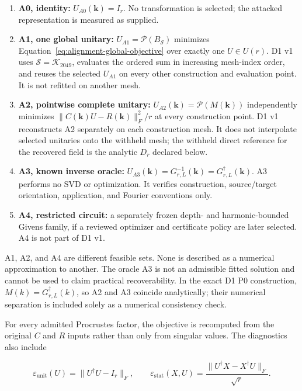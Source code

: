 \documentclass[11pt]{article}
\begin{document}
\begin{enumerate}
\item \textbf{A0, identity:}
$U_{A0}(\mathbf k)=I_r$. No transformation is selected; the attacked representation is
measured as supplied.

\item \textbf{A1, one global unitary:}
$U_{A1}=\mathcal P(B_{\mathcal S})$ minimizes
Equation~\eqref{eq:alignment-global-objective} over exactly one $U\in U(r)$. D1 v1 uses
$\mathcal S=\mathcal K_{2049}$, evaluates the ordered sum in increasing mesh-index order,
and reuses the selected $U_{A1}$ on every other construction and evaluation point. It
is not refitted on another mesh.

\item \textbf{A2, pointwise complete unitary:}
$U_{A2}(\mathbf k)=\mathcal P(M(\mathbf k))$ independently minimizes
$\lVert C(\mathbf k)U-R(\mathbf k)\rVert_F^2/r$ at every construction point. D1 v1
reconstructs A2 separately on each construction mesh. It does not interpolate selected
unitaries onto the withheld mesh; the withheld direct reference for the recovered field
is the analytic $D_r$ declared below.

\item \textbf{A3, known inverse oracle:}
$U_{A3}(\mathbf k)=G_{r,L}^{-1}(\mathbf k)=G_{r,L}^\dagger(\mathbf k)$. A3 performs no
SVD or optimization. It verifies construction, source/target orientation, application,
and Fourier conventions only.

\item \textbf{A4, restricted circuit:} a separately frozen depth- and harmonic-bounded
Givens family, if a reviewed optimizer and certificate policy are later selected. A4 is
not part of D1 v1.
\end{enumerate}

A1, A2, and A4 are different feasible sets. None is described as a numerical
approximation to another. The oracle A3 is not an admissible fitted solution and cannot
be used to claim practical recoverability. In the exact D1 P0 construction,
$M(k)=G_{r,L}^\dagger(k)$, so A2 and A3 coincide analytically; their numerical separation
is included solely as a numerical consistency check.

For every admitted Procrustes factor, the objective is recomputed from the original
$C$ and $R$ inputs rather than only from singular values. The diagnostics also include

\begin{equation}
 \varepsilon_{\mathrm{unit}}(U)=\lVert U^\dagger U-I_r\rVert_F,
 \qquad
 \varepsilon_{\mathrm{stat}}(X,U)
 =\frac{\lVert U^\dagger X-X^\dagger U\rVert_F}{\sqrt r}.
 \label{eq:alignment-integrity-defects}
\end{equation}
\end{document}
